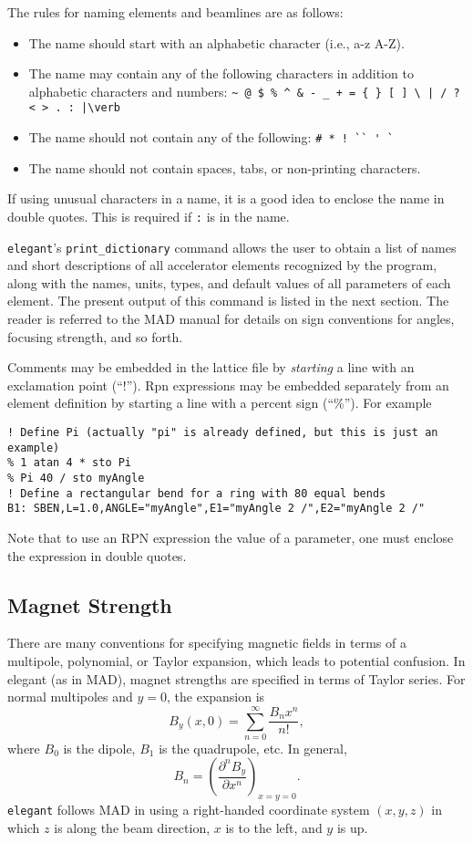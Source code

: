 \documentclass[11pt]{article}
\begin{document}
The rules for naming elements and beamlines are as follows:
\begin{itemize}
\item The name should start with an alphabetic character (i.e., a-z A-Z).
\item The name may contain any of the following characters in addition to
alphabetic characters and numbers: 
\verb#~ @ $ % ^ & - _ + = { } [ ] \ | / ? < > . : |\verb#
\item The name should not contain any of the following: \verb|# * ! `` ' `|
\item The name should not contain spaces, tabs, or non-printing characters.
\end{itemize}
If using unusual characters in a name, it is a good idea to enclose the name
in double quotes.   This is required if \verb|:| is in the name.

{\tt elegant}'s \verb|print_dictionary| command allows the user to
obtain a list of names and short descriptions of all accelerator
elements recognized by the program, along with the names, units,
types, and default values of all parameters of each element. 
The present output of this command is listed in the next section.
The reader is referred to the MAD manual\cite{MAD} for details on sign
conventions for angles, focusing strength, and so forth.  

Comments may be embedded in the lattice file by {\em starting} a line with 
an exclamation point (``!'').
Rpn expressions may be embedded separately
from an element definition by starting a line with a percent sign (``\%'').
For example
\begin{verbatim}
! Define Pi (actually "pi" is already defined, but this is just an example)
% 1 atan 4 * sto Pi
% Pi 40 / sto myAngle
! Define a rectangular bend for a ring with 80 equal bends
B1: SBEN,L=1.0,ANGLE="myAngle",E1="myAngle 2 /",E2="myAngle 2 /"
\end{verbatim}
Note that to use an RPN expression the value of a parameter, one must enclose the
expression in double quotes.

\subsection{Magnet Strength}

There are many conventions for specifying magnetic fields in terms of a multipole, polynomial, or Taylor expansion, which leads to
potential confusion.
In elegant (as in MAD\cite{MAD}), magnet strengths are specified in terms of Taylor series.
For normal multipoles and $y=0$, the expansion is
\begin{equation}
B_y(x,0)= \sum_{n=0}^\infty \frac{B_n x^n}{n!},
\end{equation}
where $B_0$ is the dipole, $B_1$ is the quadrupole, etc.
In general,
\begin{equation}
B_n = \left(\frac{\partial^n B_y}{\partial x^n}\right)_{x=y=0}.
\end{equation}
{\tt elegant} follows MAD \cite{MAD} in using a right-handed coordinate system $(x, y, z)$ 
in which $z$ is along the beam direction, $x$ is to the left, and $y$ is up.
\end{document}
